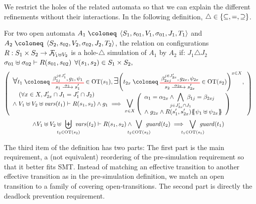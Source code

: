 \documentclass{article}
\begin{document}
We restrict the holes of the related automata so that we can explain the different refinements without their interactions.
In the following definition, \(\triangle \in \mbrc{\subseteq, =, \supseteq}\).
\begin{defi}
For two open automata \(A_1 \defobject \OAg[1]\) and \(A_2 \defobject \OAg[2]\), the relation on configurations \(R: S_1 \times S_2 \to \rformulas[V_1 \uplus V_2]\) is a hole-\(\triangle\) simulation of \(A_1\) by \(A_2\) if:
 \(J_1 \triangle J_2\)
 \(\sigma_{01} \uplus \sigma_{02} \vdash R\mpar{s_{01}, s_{02}}\)
 \(\forall \mpar{s_1, s_2} \in S_1 \times S_2,\)\vspace{-8pt}
\noindent\begin{multline*}
	\mpar{\everymath{\displaystyle}\begin{array}{l}
		\bigsymb{\forall} t_1 \defobject \OTx{1}{}{1}{1} \in \fOT{s_1}, \bigsymb{\exists} \mpar{t_{2x} \defobject \OTx{2}{x}{2x}{2x} \in \fOT{s_2}}^{x \in X}, \\
		\quad \mpar{\forall x \in X, J'_{2x} \cap J_1 = J'_1 \cap J_2} \\[-10pt]
		\nwedge V_1 \uplus V_2 \uplus \fvars{t_1} \vdash R\mpar{s_1, s_2} \wedge g_1 \implies \operatorname*{\bigsymb{\bigvee}}_{x \in X} \mpar{\begin{array}{l}
			\alpha_1 = \alpha_{2x} \wedge \bigwedge_\subbox{j \in J'_{2x} \cap J_1} \beta_{1j} = \beta_{2xj} \\[12pt]
			\nwedge g_{2x} \wedge R\mpar{s'_1, s'_{2x}}\psubst{\psi_1 \uplus \psi_{2x}}
		\end{array}}
	\end{array}} \\
	\wedge V_1 \uplus V_2 \uplus \biguplus_\subbox{t_2 \in \fOT{s_2}} \fvars{t_2} \vdash R\mpar{s_1, s_2} \wedge \bigvee_\subbox{t_2 \in \fOT{s_2}} \fguard{t_2} \implies \bigvee_\subbox{t_1 \in \fOT{s_1}} \fguard{t_1}
\end{multline*}
\end{defi}
The third item of the definition has two parts:
The first part is the main requirement, a (not equivalent) reordering of the pre-simulation requirement so that it better fits SMT.
Instead of matching an effective transition to another effective transition as in the pre-simulation definition, we match an open transition to a family of covering open-transitions.
The second part is directly the deadlock prevention requirement.

\end{document}
